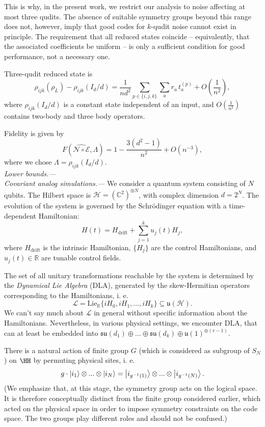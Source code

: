 \documentclass[twocolumn,superscriptaddress,aps,showpacs,amsmath,amstex,amssymb,citeautoscript,floatfix,pra,preprintnumbers]{revtex4-2}
\theoremstyle{plain}
\theoremstyle{plain}
\theoremstyle{plain}
\theoremstyle{plain}
\theoremstyle{plain}
\theoremstyle{plain}
\begin{document}
This is why, in the present work, we restrict our analysis to noise affecting at most three qudits. The absence of suitable symmetry groups beyond this range does not, however, imply that good codes for $k$-qudit noise cannot exist in principle. The requirement that all reduced states coincide -- equivalently, that the associated coefficients be uniform -- is only a sufficient condition for good performance, not a necessary one.

Three-qudit reduced state is
\[
    \rho_{ijk}(\rho_L)-\rho_{ijk}(I_d/d)
    =
    \frac{1}{nd^2}\sum_{p\in\{i,j,k\}}\sum_a r_a\, t_a^{(p)}
    +O\!\left(\frac1{n^2}\right),
\]
where $\rho_{ijk}(I_d/d)$ is a constant state independent of an input, and $O\!\left(\frac1{n^2}\right)$ contains two-body and three body operators.

Fidelity is given by
\[
    F(\widehat{\mathcal{N} \circ \mathcal{E}}, \Lambda)=1-\frac{3\left(d^2-1\right)}{n^2}+O\left(n^{-3}\right),
\]
where we chose $\Lambda=\rho_{ijk}(I_d/d)$.\\
\textit{Lower bounds.---}\\
\textit{Covariant analog simulations.---} 
We consider a quantum system consisting of $N$ qubits. The Hilbert space is $\mathcal{H} = (\mathbb{C}^2)^{\otimes N}$, with complex dimension $d = 2^N$. The evolution of the system is governed by the Schrödinger equation with a time-dependent Hamiltonian:
$$
    H(t) = H_{\mathrm{drift}} + \sum_{j=1}^k u_j(t) H_j,
$$
where $H_{\mathrm{drift}}$ is the intrinsic Hamiltonian, $\{H_j\}$ are the control Hamiltonians, and $u_j(t) \in \mathbb{R}$ are tunable control fields.

The set of all unitary transformations reachable by the system is determined by the \textit{Dynamical Lie Algebra} (DLA), generated by the skew-Hermitian operators corresponding to the Hamiltonians, i. e.
\begin{equation}
    \mathcal{L} = \mathrm{Lie}_{\mathbb{R}} \{ iH_0, iH_1, \dots, iH_k \} \subseteq \mathfrak{u}(\mathcal{H}).
\end{equation}
We can't say much about $\mathcal{L}$ in general without specific information about the Hamiltonians. Nevertheless, in various physical settings, we encounter DLA, that can at least be embedded into $\mathfrak{s} \mathfrak{u}\left(d_1\right) \oplus \ldots \oplus \mathfrak{s} \mathfrak{u}\left(d_k\right) \oplus \mathfrak{u}(1)^{\oplus(r-1)}$.

There is a natural action of finite group $G$ (which is considered as subgroup of $S_N$) on $\HH$ by permuting physical sites, i. e.
\[
    g\cdot \ket{i_1}\otimes...\otimes\ket{i_N}=\ket{i_{g^{-1}(1)}}\otimes...\otimes\ket{i_{g^{-1}(N)}}.
\]
(We emphasize that, at this stage, the symmetry group acts on the logical space. It is therefore conceptually distinct from the finite group considered earlier, which acted on the physical space in order to impose symmetry constraints on the code space. The two groups play different roles and should not be confused.)
\end{document}

